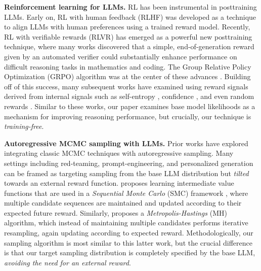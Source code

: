 \documentclass{article}
\renewcommand{\paragraph}[1]{\vspace{.1em}\noindent\textbf{#1}}
\begin{document}
\paragraph{Reinforcement learning for LLMs.} RL has been instrumental in posttraining LLMs. Early on, RL with human feedback (RLHF) \citep{ouyang2022traininglfh} was developed as a technique to align LLMs with human preferences using a trained reward model. Recently, RL with verifiable rewards (RLVR) has emerged as a powerful new posttraining technique, where many works \citep{guo2025deepseekr1,lambert2024tulu3,hu2025openreasonerzero,zeng2025simplerlzoo} discovered that a simple, end-of-generation reward given by an automated verifier could substantially enhance performance on difficult reasoning tasks in mathematics and coding. The Group Relative Policy Optimization (GRPO) algorithm was at the center of these advances \citep{shao2024deepseekmath}. Building off of this success, many subsequent works have examined using reward signals derived from internal signals such as self-entropy \citep{zhao2025learning}, confidence \citep{prabhudesai2025maximizingconfidence}, and even random rewards \citep{shao2025spuriousrewards}. Similar to these works, our paper examines base model likelihoods as a mechanism for improving reasoning performance, but crucially, our technique is \textit{training-free}.

\paragraph{Autoregressive MCMC sampling with LLMs.} Prior works have explored integrating classic MCMC techniques with autoregressive sampling. Many settings including red-teaming, prompt-engineering, and personalized generation can be framed as targeting sampling from the base LLM distribution but \textit{tilted} towards an external reward function. \cite{zhao2024probabilisticinference} proposes learning intermediate value functions that are used in a \textit{Sequential Monte Carlo} (SMC) framework \citep{chopin2004cltsmc}, where multiple candidate sequences are maintained and updated according to their expected future reward. Similarly, \cite{faria2024quest} proposes a \textit{Metropolis-Hastings} (MH) algorithm, which instead of maintaining multiple candidates performs iterative resampling, again updating according to expected reward. Methodologically, our sampling algorithm is most similar to this latter work, but the crucial difference is that our target sampling distribution is completely specified by the base LLM, \textit{avoiding the need for an external reward}.
\end{document}
